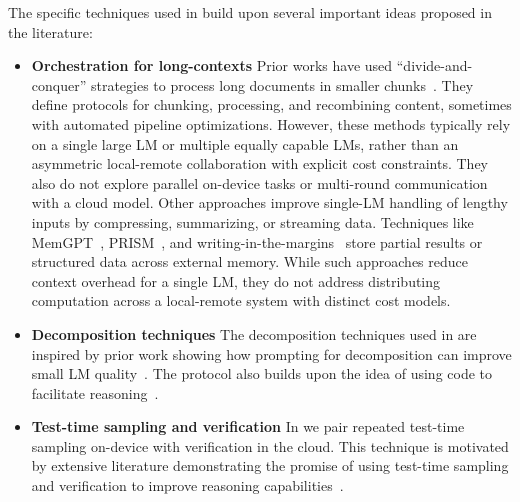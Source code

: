 The specific techniques used in \system build upon several important ideas proposed in the literature:

\setlength{\leftmargini}{12pt} %
\begin{itemize}

\item \textbf{Orchestration for long-contexts} Prior works have used ``divide-and-conquer'' strategies to process long documents in smaller chunks~\citep{zhang2024chain, zhou2024llm, shankar2024docetl}. They define protocols for chunking, processing, and recombining content, sometimes with automated pipeline optimizations. However, these methods typically rely on a single large LM or multiple equally capable LMs, rather than an asymmetric local-remote collaboration with explicit cost constraints. They also do not explore parallel on-device tasks or multi-round communication with a cloud model. Other approaches improve single-LM handling of lengthy inputs by compressing, summarizing, or streaming data. Techniques like MemGPT~\citep{packer2023memgpt}, PRISM~\citep{jayalath2024long}, and writing-in-the-margins~\citep{russak2024writing} store partial results or structured data across external memory.  While such approaches reduce context overhead for a single LM, they do not address distributing computation across a local-remote system with distinct cost models.

\item \textbf{Decomposition techniques} The decomposition techniques used in \system are inspired by prior work showing how prompting for decomposition can improve small LM quality~\citep{arora2022ask, patel2022question, wu2022ai}. The \system protocol also builds upon the idea of using code to facilitate reasoning~\citep{arora2023evaporate,li2023chain}.

\item \textbf{Test-time sampling and verification} In \system we pair repeated test-time sampling on-device with verification in the cloud. This technique is motivated by extensive literature demonstrating the promise of using test-time sampling and verification to improve reasoning capabilities~\citep{brown2024large,song2024good,hassid2024larger,snell2024scaling,wu2024empirical}.

\end{itemize}


